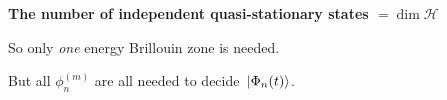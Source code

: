 \documentclass[t]{beamer}
\begin{document}
\begin{frame}
\begin{columns}
\begin{column}{0.39\textwidth}
\begin{minipage}{\columnwidth}
{               
        }
    \end{minipage}
\end{column}

\end{columns}

\vspace{0.5cm}

\textbf{The number of independent quasi-stationary states $= \dim \mathcal{H}$}

So only \emph{one} energy Brillouin zone is needed.

\vspace{0.5cm}

But all $\phi_n^{(m)}$ are all needed to decide $\ket*{\Phi_n(t)}$.

\end{frame}
\end{document}
